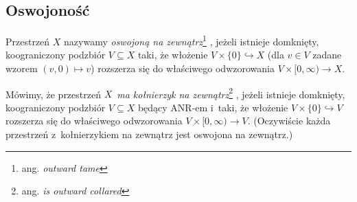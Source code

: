 


\subsection{Oswojoność}
Przestrzeń $X$ nazywamy \textit{oswojoną na zewnątrz}\footnote{ang. \textit{outward tame}} \cite{Quinn88,Hughes96}, jeżeli istnieje domknięty, koograniczony podzbiór $V\subseteq X$ taki, że włożenie $V\times \{0\}\hookrightarrow X$ (dla $v\in V$ zadane wzorem $(v,0)\mapsto v$) rozszerza się do właściwego odwzorowania $V\times [0,\infty)\to X$.

Mówimy, że przestrzeń $X$~\textit{ma kołnierzyk na zewnątrz}\footnote{ang. \textit{is outward collared}} \cite{Hughes96}, jeżeli istnieje domknięty, koograniczony podzbiór $V\subseteq X$ będący ANR-em i~taki, że włożenie $V\times\{0\}\hookrightarrow V$ rozszerza się do właściwego odwzorowania $V\times [0,\infty)\to V$. (Oczywiście każda przestrzeń z~kołnierzykiem na zewnątrz jest oswojona na zewnątrz.)

